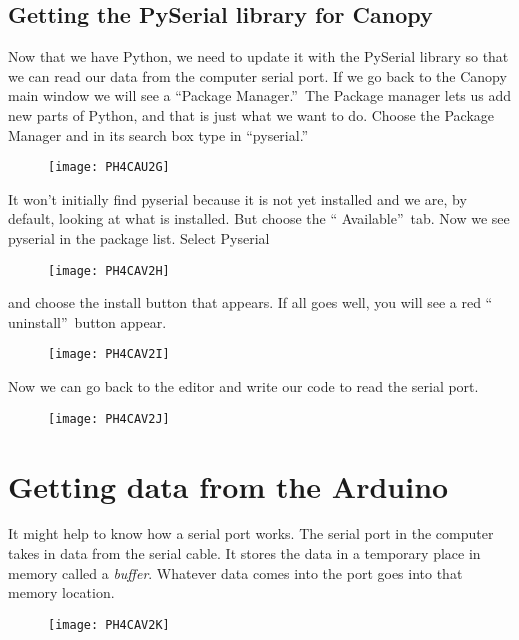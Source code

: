 \subsection{Getting the PySerial library for Canopy\label{Canopy}}

Now that we have Python, we need to update it with the PySerial library so
that we can read our data from the computer serial port. If we go back to
the Canopy main window we will see a \textquotedblleft Package
Manager.\textquotedblright\ The Package manager lets us add new parts of
Python, and that is just what we want to do. Choose the Package Manager and
in its search box type in \textquotedblleft pyserial.\textquotedblright 
\begin{figure}[h!]
\texttt{[image: PH4CAU2G]}
\end{figure}

It won't initially find pyserial because it is not yet installed and we are,
by default, looking at what is installed. But choose the \textquotedblleft
Available\textquotedblright\ tab. Now we see pyserial in the package list.
Select Pyserial\begin{figure}[h!]
\texttt{[image: PH4CAV2H]}
\end{figure}and choose the install button
that appears. If all goes well, you will see a red \textquotedblleft
uninstall\textquotedblright\ button appear.\begin{figure}[h!]
\texttt{[image: PH4CAV2I]}
\end{figure}

Now we can go back to the editor and write our code to read the serial port. 
\begin{figure}[h!]
\texttt{[image: PH4CAV2J]}
\end{figure}

\section{Getting data from the Arduino}

It might help to know how a serial port works. The serial port in the
computer takes in data from the serial cable. It stores the data in a
temporary place in memory called a \emph{buffer}. Whatever data comes into
the port goes into that memory location. \begin{figure}[h!]
\texttt{[image: PH4CAV2K]}
\end{figure}

